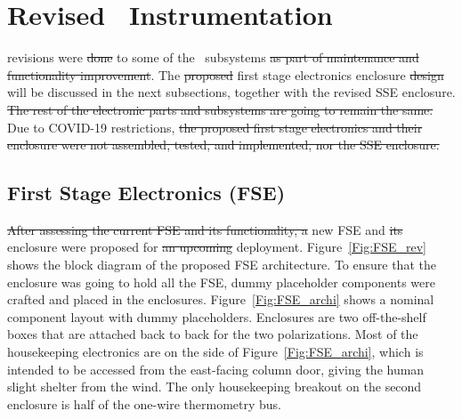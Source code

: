 \section{Revised \prizm~Instrumentation}

 revisions  were \st{done}  to some of the \prizm\ subsystems  \st{as part of maintenance and functionality improvement}. The \st{proposed}  first stage electronics enclosure \st{design} will be discussed in the next subsections, together with the revised SSE enclosure. \st{The rest of the electronic parts and subsystems are going to remain the same.} Due to COVID-19 restrictions,  \st{the proposed first stage electronics and their enclosure were not assembled, tested, and implemented, nor the SSE enclosure.}  

\subsection{First Stage Electronics (FSE)}

\st{After assessing the current FSE and its functionality, a}  new FSE and \st{its} enclosure were proposed for \st{an upcoming}  deployment. Figure~\ref{Fig:FSE_rev} shows the block diagram of the proposed FSE architecture.  To ensure that the enclosure was going to hold all the FSE, dummy placeholder components were crafted and placed in the enclosures. Figure~\ref{Fig:FSE_archi} shows a nominal component layout with dummy placeholders. Enclosures are two off-the-shelf boxes that are attached back to back for the two polarizations. Most of the housekeeping electronics are on the side of Figure~\ref{Fig:FSE_archi}, which is intended to be accessed from the east-facing column door, giving the human slight shelter from the  wind. The only housekeeping breakout on the second enclosure is half of the one-wire thermometry bus.

